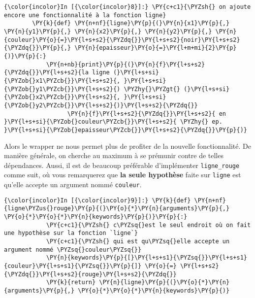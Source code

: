     \begin{Verbatim}[commandchars=\\\{\},frame=single,framerule=0.3mm,rulecolor=\color{cellframecolor}]
{\color{incolor}In [{\color{incolor}8}]:} \PY{c+c1}{\PYZsh{} on ajoute encore une fonctionnalité à la fonction ligne}
        \PY{k}{def} \PY{n+nf}{ligne}\PY{p}{(}\PY{n}{x1}\PY{p}{,} \PY{n}{y1}\PY{p}{,} \PY{n}{x2}\PY{p}{,} \PY{n}{y2}\PY{p}{,} \PY{n}{couleur}\PY{o}{=}\PY{l+s+s2}{\PYZdq{}}\PY{l+s+s2}{noir}\PY{l+s+s2}{\PYZdq{}}\PY{p}{,} \PY{n}{epaisseur}\PY{o}{=}\PY{l+m+mi}{2}\PY{p}{)}\PY{p}{:}
            \PY{n+nb}{print}\PY{p}{(}\PY{n}{f}\PY{l+s+s2}{\PYZdq{}}\PY{l+s+s2}{la ligne (}\PY{l+s+si}{\PYZob{}x1\PYZcb{}}\PY{l+s+s2}{, }\PY{l+s+si}{\PYZob{}y1\PYZcb{}}\PY{l+s+s2}{) \PYZhy{}\PYZgt{} (}\PY{l+s+si}{\PYZob{}x2\PYZcb{}}\PY{l+s+s2}{, }\PY{l+s+si}{\PYZob{}y2\PYZcb{}}\PY{l+s+s2}{)}\PY{l+s+s2}{\PYZdq{}}
                  \PY{n}{f}\PY{l+s+s2}{\PYZdq{}}\PY{l+s+s2}{ en }\PY{l+s+si}{\PYZob{}couleur\PYZcb{}}\PY{l+s+s2}{ \PYZhy{} ep. }\PY{l+s+si}{\PYZob{}epaisseur\PYZcb{}}\PY{l+s+s2}{\PYZdq{}}\PY{p}{)}
\end{Verbatim}


    Alors le wrapper ne nous permet plus de profiter de la nouvelle
fonctionnalité. De manière générale, on cherche au maximum à se prémunir
contre de telles dépendances. Aussi, il est de beaucoup préférable
d'implémenter \texttt{ligne\_rouge} comme suit, où vous remarquerez que
\textbf{la seule hypothèse} faite sur \texttt{ligne} est qu'elle accepte
un argument nommé \texttt{couleur}.

    \begin{Verbatim}[commandchars=\\\{\},frame=single,framerule=0.3mm,rulecolor=\color{cellframecolor}]
{\color{incolor}In [{\color{incolor}9}]:} \PY{k}{def} \PY{n+nf}{ligne\PYZus{}rouge}\PY{p}{(}\PY{o}{*}\PY{n}{arguments}\PY{p}{,} \PY{o}{*}\PY{o}{*}\PY{n}{keywords}\PY{p}{)}\PY{p}{:}
            \PY{c+c1}{\PYZsh{} c\PYZsq{}est le seul endroit où on fait une hypothèse sur la fonction `ligne`}
            \PY{c+c1}{\PYZsh{} qui est qu\PYZsq{}elle accepte un argument nommé \PYZsq{}couleur\PYZsq{}}
            \PY{n}{keywords}\PY{p}{[}\PY{l+s+s1}{\PYZsq{}}\PY{l+s+s1}{couleur}\PY{l+s+s1}{\PYZsq{}}\PY{p}{]} \PY{o}{=} \PY{l+s+s2}{\PYZdq{}}\PY{l+s+s2}{rouge}\PY{l+s+s2}{\PYZdq{}}
            \PY{k}{return} \PY{n}{ligne}\PY{p}{(}\PY{o}{*}\PY{n}{arguments}\PY{p}{,} \PY{o}{*}\PY{o}{*}\PY{n}{keywords}\PY{p}{)}
\end{Verbatim}


